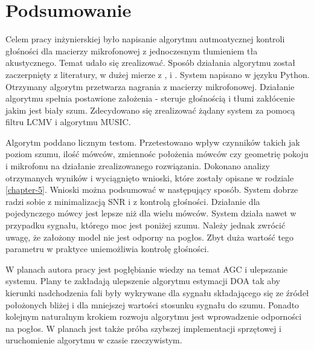 \chapter{Podsumowanie}
\label{chapter-6}

Celem pracy inżynierskiej było napisanie algorytmu autmoatycznej kontroli głośności dla macierzy mikrofonowej z jednoczesnym tlumieniem tła akustycznego. Temat udało się zrealizować. Sposób działania algorytmu został zaczerpnięty z literatury, w dużej mierze z \cite{Braun2014}, \cite{Thiergart2013} i  \cite{Schmidt1986}. System napisano w języku Python. Otrzymany algorytm przetwarza nagrania z macierzy mikrofonowej. Działanie algorytmu spełnia postawione założenia - steruje głośnością i tłumi zakłócenie jakim jest biały szum. Zdecydowano się zrealizować żądany system za pomocą filtru LCMV i algorytmu MUSIC.

Algorytm poddano licznym testom. Przetestowano wpływ czynników takich jak poziom szumu, ilość mówców, zmiennośc położenia mówców czy geometrię pokoju i mikrofonu na działanie zrealizowanego rozwiązania. Dokonano analizy otrzymanych wyników i wyciągnięto wnioski, które zostały opisane w rodziale \ref{chapter-5}. Wnioski można podsumować w następujący sposób. System dobrze radzi sobie z minimalizacją SNR i z kontrolą głośności. Działanie dla pojedynczego mówcy jest lepsze niż dla wielu mówców. System działa nawet w przypadku sygnału, którego moc jest poniżej szumu. Należy jednak zwrócić uwagę, że założony model nie jest odporny na pogłos. Zbyt duża wartość tego parametru w praktyce uniemożliwia kontrolę głośności.

W planach autora pracy jest pogłębianie wiedzy na temat AGC i ulepszanie systemu. Plany te zakładają ulepszenie algorytmu estymacji DOA tak aby kierunki nadchodzenia fali były wykrywane dla sygnału składającego się ze źródeł położonych bliżej i dla mniejszej wartości stosunku sygnału do szumu. Ponadto kolejnym naturalnym krokiem rozwoju algorytmu jest wprowadzenie odporności na pogłos. W planach jest także próba szybszej implementacji sprzętowej i uruchomienie algorytmu w czasie rzeczywistym.